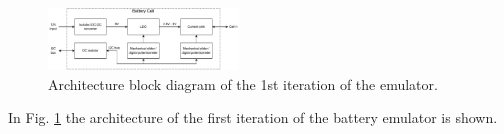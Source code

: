 \begin{figure}[h]
    \begin{center}
        \includegraphics[width=0.45\textwidth]{Battery_cell_diagram-Single_cell.pdf}
    \end{center}
    \caption{Architecture block diagram of the 1st iteration of the emulator.}
    \label{fig:1st_architecture}
\end{figure}

In Fig. \ref{fig:1st_architecture} the architecture of the first iteration 
of the battery emulator is shown.
